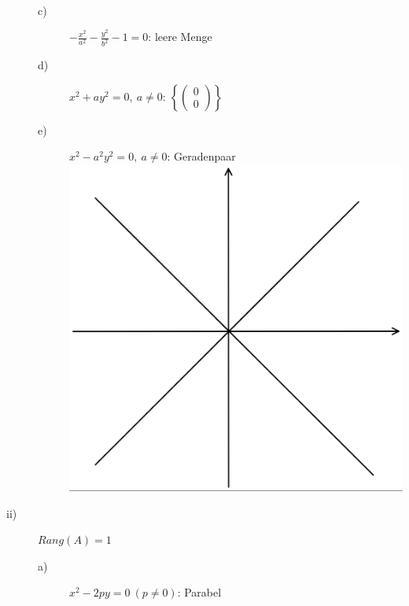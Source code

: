 \documentclass{scrbook}
\begin{document}
\begin{description}
\begin{description}
\\
\item[c)] $-\frac{x^2}{a^2} - \frac{y^2}{b^2} -1 = 0$: leere Menge
\item[d)] $x^2+ay^2 = 0, \ a\neq 0$: $\left\{ \left(
\begin{array}{c}
0\\0
\end{array}
\right)\right\}$
\item[e)] $x^2-a^2y^2=0,\ a\neq 0$: Geradenpaar
\\
\includegraphics{Satz_15_2_3.png}
\\
\end{description}
\item[ii)] $Rang(A) = 1$
\begin{description}
\item[a)] $x^2-2py = 0 \ (p\neq 0)$: Parabel
\\

\end{description}
\end{description}
\end{document}
